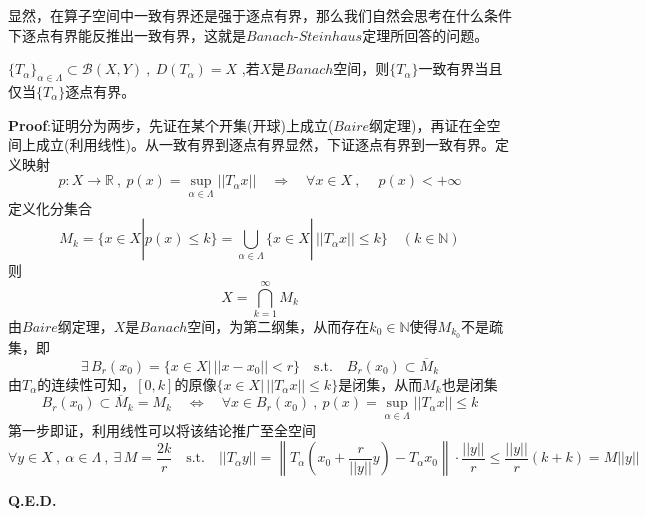 显然，在算子空间中一致有界还是强于逐点有界，那么我们自然会思考在什么条件下逐点有界能反推出一致有界，这就是$Banach$-$Steinhaus$定理所回答的问题。
\begin{theorem}[一致有界定理]
    $\{T_{\alpha}\}_{\alpha \in \Lambda} \subset \mathscr{B}(X,Y) \ , \ D(T_{\alpha})=X$ ,若$X$是$Banach$空间，则$\{T_{\alpha}\}$一致有界当且仅当$\{T_{\alpha}\}$逐点有界。
\end{theorem} 
\textbf{Proof}:证明分为两步，先证在某个开集(开球)上成立($Baire$纲定理)，再证在全空间上成立(利用线性)。从一致有界到逐点有界显然，下证逐点有界到一致有界。定义映射
\[p:X \to \mathbb{R} \ , \ p(x)=\mathop \text{sup}\limits_{\alpha \in \Lambda}||T_{\alpha}x|| \quad \Rightarrow \quad \forall x \in X \ , \ \quad p(x)<+\infty\]
定义化分集合
\[M_k=\{x \in X|p(x) \leq k\}=\bigcup_{\alpha \in \Lambda}\{x \in X| \, ||T_{\alpha}x|| \leq k\} \quad (k \in \mathbb{N})\]
则
\[X=\bigcap_{k=1}^{\infty}M_k\]
由$Baire$纲定理，$X$是$Banach$空间，为第二纲集，从而存在$k_0 \in \mathbb{N}$使得$M_{k_0}$不是疏集，即
\[\exists \, B_r(x_0)=\{x \in X| \, ||x-x_0||<r\} \quad \text{s.t.} \quad B_r(x_0) \subset \overline{M}_k\]
由$T_{\alpha}$的连续性可知，$[0,k]$的原像$\{x \in X| \, ||T_{\alpha}x|| \leq k\}$是闭集，从而$M_k$也是闭集
\[B_r(x_0) \subset \overline{M}_k=M_k \quad \Leftrightarrow \quad \forall x \in B_r(x_0) \ , \ p(x)=\mathop \text{sup}\limits_{\alpha \in \Lambda}||T_{\alpha}x|| \leq k\]
第一步即证，利用线性可以将该结论推广至全空间
\[\forall y \in X \ , \ \alpha \in \Lambda \ , \ \exists \, M=\frac{2k}{r} \quad \text{s.t.} \quad ||T_{\alpha}y||=\left\|T_{\alpha}\left(x_0+\frac{r}{||y||}y\right)-T_{\alpha}x_0\right\| \cdot \frac{||y||}{r} \leq \frac{||y||}{r}(k+k)=M||y||\]

\textbf{Q.E.D.}

